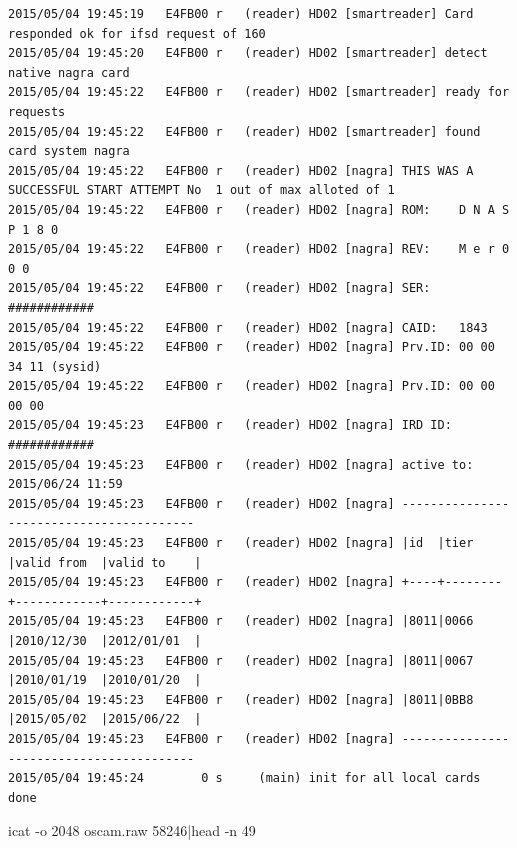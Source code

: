 \begin{cmd}[H]
\begin{Verbatim}[fontsize=\tiny]
2015/05/04 19:45:19   E4FB00 r   (reader) HD02 [smartreader] Card responded ok for ifsd request of 160
2015/05/04 19:45:20   E4FB00 r   (reader) HD02 [smartreader] detect native nagra card
2015/05/04 19:45:22   E4FB00 r   (reader) HD02 [smartreader] ready for requests
2015/05/04 19:45:22   E4FB00 r   (reader) HD02 [smartreader] found card system nagra
2015/05/04 19:45:22   E4FB00 r   (reader) HD02 [nagra] THIS WAS A SUCCESSFUL START ATTEMPT No  1 out of max alloted of 1
2015/05/04 19:45:22   E4FB00 r   (reader) HD02 [nagra] ROM:    D N A S P 1 8 0
2015/05/04 19:45:22   E4FB00 r   (reader) HD02 [nagra] REV:    M e r 0 0 0
2015/05/04 19:45:22   E4FB00 r   (reader) HD02 [nagra] SER:    ############
2015/05/04 19:45:22   E4FB00 r   (reader) HD02 [nagra] CAID:   1843
2015/05/04 19:45:22   E4FB00 r   (reader) HD02 [nagra] Prv.ID: 00 00 34 11 (sysid)
2015/05/04 19:45:22   E4FB00 r   (reader) HD02 [nagra] Prv.ID: 00 00 00 00
2015/05/04 19:45:23   E4FB00 r   (reader) HD02 [nagra] IRD ID: ############
2015/05/04 19:45:23   E4FB00 r   (reader) HD02 [nagra] active to: 2015/06/24 11:59
2015/05/04 19:45:23   E4FB00 r   (reader) HD02 [nagra] -----------------------------------------
2015/05/04 19:45:23   E4FB00 r   (reader) HD02 [nagra] |id  |tier    |valid from  |valid to    |
2015/05/04 19:45:23   E4FB00 r   (reader) HD02 [nagra] +----+--------+------------+------------+
2015/05/04 19:45:23   E4FB00 r   (reader) HD02 [nagra] |8011|0066    |2010/12/30  |2012/01/01  |
2015/05/04 19:45:23   E4FB00 r   (reader) HD02 [nagra] |8011|0067    |2010/01/19  |2010/01/20  |
2015/05/04 19:45:23   E4FB00 r   (reader) HD02 [nagra] |8011|0BB8    |2015/05/02  |2015/06/22  |
2015/05/04 19:45:23   E4FB00 r   (reader) HD02 [nagra] -----------------------------------------
2015/05/04 19:45:24        0 s     (main) init for all local cards done
\end{Verbatim}
\caption{icat -o 2048 oscam.raw 58246|head -n 49}
\label{cmd:oscam-loghead}
\end{cmd}


